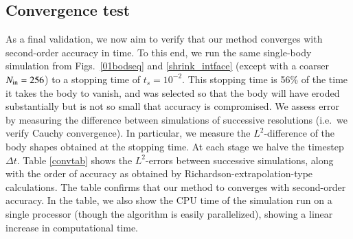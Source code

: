 \documentclass[preprint, 10pt]{elsarticle}
\begin{document}
\subsection{Convergence test}

As a final validation, we now aim to verify that our method converges with second-order accuracy in time. To this end, we run the same single-body simulation from Figs.~\ref{01bodseq} and \ref{shrink_intface} (except with a coarser $N_{\mathrm{in}}=256$) to a stopping time of $t_s = 10^{-2}$. This stopping time is 56\% of the time it takes the body to vanish, and was selected so that the body will have eroded substantially but is not so small that accuracy is compromised. We assess error by measuring the difference between simulations of successive resolutions (i.e.~we verify Cauchy convergence). In particular, we measure the $L^2$-difference of the body shapes obtained at the stopping time. At each stage we halve the timestep $\Delta t$. Table \ref{convtab} shows the $L^2$-errors between successive simulations, along with the order of accuracy as obtained by Richardson-extrapolation-type calculations. The table confirms that our method to converges with second-order accuracy. In the table, we also show the CPU time of the simulation run on a single processor (though the algorithm is easily parallelized), showing a linear increase in computational time.
\end{document}
